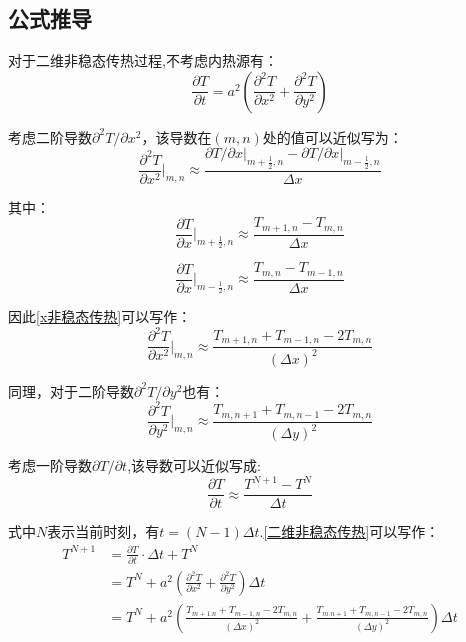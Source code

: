 \subsection{公式推导}

对于二维非稳态传热过程,不考虑内热源有：
\begin{equation}\label{二维非稳态传热}
    \frac{\partial T}{\partial t} = a^2(\frac{\partial^2 T}{\partial x^2}+\frac{\partial^2 T}{\partial y^2})
\end{equation}

考虑二阶导数$\partial^2 T/\partial x^2$，该导数在$(m,n)$处的值可以近似写为：
\begin{equation}\label{x非稳态传热}
    \frac{\partial^2 T}{\partial x^2}\big|_{m,n} \approx \frac{\partial T/\partial x\big|_{m+\frac{1}{2},n}-\partial T/\partial x\big|_{m-\frac{1}{2},n}}{\Delta x}
\end{equation}

其中：
\begin{equation}
    \frac{\partial T}{\partial x}\big|_{m+\frac{1}{2},n} \approx \frac{T_{m+1,n}-T_{m,n}}{\Delta x}
\end{equation}

\begin{equation}
    \frac{\partial T}{\partial x}\big|_{m-\frac{1}{2},n} \approx \frac{T_{m,n}-T_{m-1,n}}{\Delta x}
\end{equation}

因此\eqref{x非稳态传热}可以写作：
\begin{equation}\label{x方向二阶导数离散化}
    \frac{\partial^2 T}{\partial x^2}\big|_{m,n} \approx \frac{T_{m+1,n}+T_{m-1,n}-2T_{m,n}}{(\Delta x)^2}
\end{equation}

同理，对于二阶导数$\partial^2 T/\partial y^2$也有：
\begin{equation}\label{y方向二阶导数离散化}
    \frac{\partial^2 T}{\partial y^2}\big|_{m,n} \approx \frac{T_{m,n+1}+T_{m,n-1}-2T_{m,n}}{(\Delta y)^2}
\end{equation}

考虑一阶导数$\partial T/\partial t$,该导数可以近似写成:
\begin{equation}
    \frac{\partial T}{\partial t} \approx \frac{T^{N+1} - T^N}{\Delta t}
\end{equation}

式中$N$表示当前时刻，有$t =(N-1)\Delta t$.\eqref{二维非稳态传热}可以写作：
\begin{equation}
    \begin{aligned}
        T^{N+1} &= \frac{\partial T}{\partial t} \cdot \Delta t + T^N \\
                &= T^N + a^2(\frac{\partial^2 T}{\partial x^2}+\frac{\partial^2 T}{\partial y^2})\Delta t\\
                &= T^N +a^2(\frac{T_{m+1.n}+T_{m-1,n}-2T_{m,n}}{(\Delta x)^2}+\frac{T_{m.n+1}+T_{m,n-1}-2T_{m,n}}{(\Delta y)^2})\Delta t
    \end{aligned}
\end{equation}

